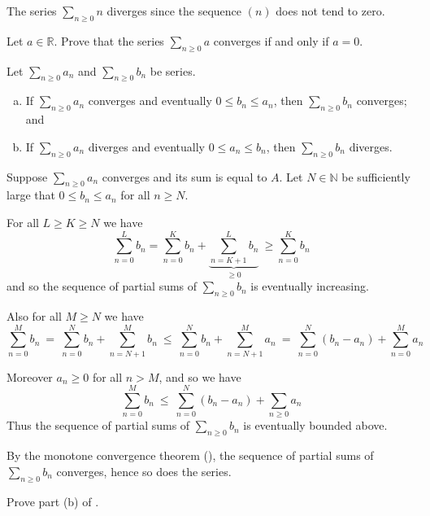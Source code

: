 \begin{example}
The series $\displaystyle \sum_{n \ge 0} n$ diverges since the sequence $(n)$ does not tend to zero.
\end{example}

\begin{exercise}
Let $a \in \mathbb{R}$. Prove that the series $\sum_{n \ge 0} a$ converges if and only if $a=0$.
\end{exercise}

\begin{theorem}
\label{thmComparisonTest}
Let $\sum_{n \ge 0} a_n$ and $\sum_{n \ge 0} b_n$ be series.
\begin{enumerate}[(a)]
\item If $\sum_{n \ge 0} a_n$ converges and eventually $0 \le b_n \le a_n$, then $\sum_{n \ge 0} b_n$ converges; and
\item If $\sum_{n \ge 0} a_n$ diverges and eventually $0 \le a_n \le b_n$, then $\sum_{n \ge 0} b_n$ diverges.
\end{enumerate}
\end{theorem}

\begin{cproof}[of {(a)}]
Suppose $\sum_{n \ge 0} a_n$ converges and its sum is equal to $A$. Let $N \in \mathbb{N}$ be sufficiently large that $0 \le b_n \le a_n$ for all $n \ge N$.

For all $L \ge K \ge N$ we have
\[ \sum_{n=0}^L b_n = \sum_{n=0}^K b_n + \underbrace{\sum_{n=K+1}^L b_n}_{\ge 0} ~ \ge \sum_{n=0}^K b_n \]
and so the sequence of partial sums of $\sum_{n \ge 0} b_n$ is eventually increasing.

Also for all $M \ge N$ we have
\[ \sum_{n=0}^M b_n ~=~ \sum_{n=0}^N b_n + \sum_{n = N+1}^M b_n ~\le~ \sum_{n=0}^N b_n + \sum_{n=N+1}^M a_n ~=~ \sum_{n=0}^N (b_n-a_n) + \sum_{n=0}^M a_n \]

Moreover $a_n \ge 0$ for all $n > M$, and so we have
\[ \sum_{n=0}^M b_n ~\le~ \sum_{n=0}^N (b_n-a_n) + \sum_{n \ge 0} a_n \]
Thus the sequence of partial sums of $\sum_{n \ge 0} b_n$ is eventually bounded above.

By the monotone convergence theorem (), the sequence of partial sums of $\sum_{n \ge 0} b_n$ converges, hence so does the series.
\end{cproof}

\begin{exercise}
Prove part (b) of .
\end{exercise}

